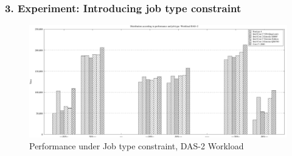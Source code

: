 \documentclass{beamer}
\begin{document}
\begin{frame}
\frametitle{3. Experiment: Introducing job type constraint}
\begin{figure}[h]
\centering
    \includegraphics[width=1.0\columnwidth]{imgs/case3_DAS}
    \caption{Performance under Job type constraint, DAS-2 Workload}
\label{jobtype2}
\end{figure}
\end{frame}
\end{document}
